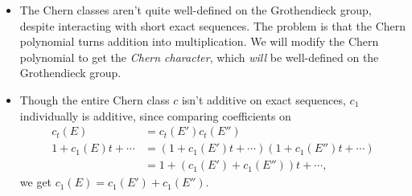 \documentclass[12pt]{article}
\begin{document}
\begin{itemize}
    \item The Chern classes aren't quite well-defined on the Grothendieck group, despite interacting with short exact sequences. The problem is that the Chern polynomial turns addition into multiplication. We will modify the Chern polynomial to get the \textit{Chern character}, which \textit{will} be well-defined on the Grothendieck group.
    \item Though the entire Chern class $c$ isn't additive on exact sequences, $c_1$ individually is additive, since comparing coefficients on
    \begin{align*}
        c_t(E) &= c_t(E') c_t(E'')\\
        1 + c_1(E)t + \cdots &= (1+c_1(E')t + \cdots)(1+c_1(E'')t + \cdots)\\
        &= 1 + (c_1(E') + c_1(E''))t + \cdots,
    \end{align*}
    we get $c_1(E) = c_1(E') + c_1(E'')$. 
\end{itemize}
\end{document}
